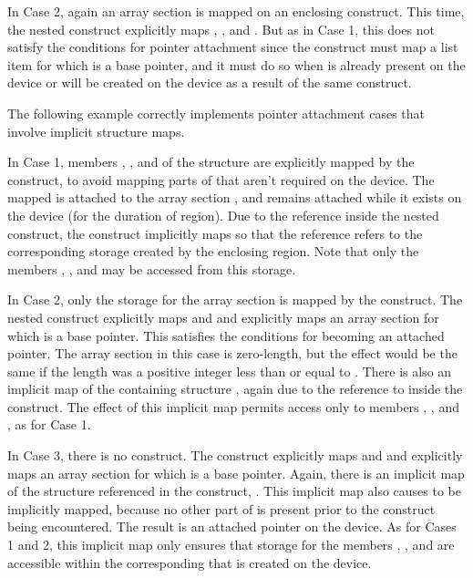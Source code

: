 In Case 2, again an array section is mapped on an enclosing 
construct. This time, the nested  construct explicitly maps
, , and . But as in Case 1, this does not
satisfy the conditions for pointer attachment since the construct must map a
list item for which  is a base pointer, and it must do so when
 is already present on the device or will be created on the device
as a result of the same construct.




The following example correctly implements pointer attachment cases that
involve implicit structure maps.

In Case 1, members , , and  of the structure 
are explicitly mapped by the  construct, to avoid
mapping parts of  that aren't required on the device. The mapped
 is attached to the array section , and remains
attached while it exists on the device (for the duration of
 region).  Due to the  reference inside the
nested  construct, the construct implicitly maps  so that
the reference refers to the corresponding storage created by the enclosing
 region. Note that only the members ,
, and  may be accessed from this storage.

In Case 2, only the storage for the array section  is mapped
by the  construct.  The nested 
construct explicitly maps  and  and explicitly
maps an array section for which  is a base pointer. This satisfies
the conditions for  becoming an attached pointer. The array
section in this case is zero-length, but the effect would be the same if the
length was a positive integer less than or equal to . There is also an
implicit map of the containing structure , again due to the reference
to  inside the construct. The effect of this implicit map permits
access only to members , , and , as for Case 1.

In Case 3, there is no  construct. The 
construct explicitly maps  and  and explicitly
maps an array section for which  is a base pointer. Again, there is
an implicit map of the structure referenced in the construct, . This
implicit map also causes  to be implicitly mapped, because no other
part of  is present prior to the construct being encountered. The
result is an attached pointer  on the device. As for Cases 1 and 2,
this implicit map only ensures that storage for the members , ,
and  are accessible within the corresponding  that is created
on the device.


